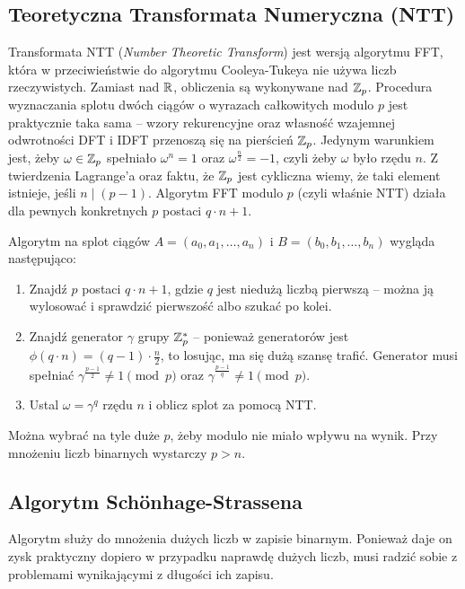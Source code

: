 \subsection{Teoretyczna Transformata Numeryczna (NTT)}
Transformata NTT (\textit{Number Theoretic Transform}) jest wersją algorytmu FFT, która w przeciwieństwie do algorytmu Cooleya-Tukeya nie używa liczb rzeczywistych. Zamiast nad \( \mathbb{R} \), obliczenia są wykonywane nad \( \mathbb{Z}_p \).
Procedura wyznaczania splotu dwóch ciągów o wyrazach całkowitych modulo \( p \) jest praktycznie taka sama -- wzory rekurencyjne oraz własność wzajemnej odwrotności DFT i IDFT przenoszą się na pierścień \( \mathbb{Z}_p \). Jedynym warunkiem jest, żeby \( \omega \in \mathbb{Z}_p \) spełniało \( \omega^n = 1 \) oraz  \( \omega^{\frac{n}{2}} = -1 \), czyli żeby \( \omega \) było rzędu \( n \).
Z twierdzenia Lagrange'a oraz faktu, że \( \mathbb{Z}_p \) jest cykliczna wiemy, że taki element istnieje, jeśli \( n \mid (p - 1) \). Algorytm FFT modulo \( p \) (czyli właśnie NTT) działa dla pewnych konkretnych \( p \) postaci \( q \cdot n + 1 \).

Algorytm na splot ciągów \( A = (a_0, a_1, \ldots, a_n) \) i \( B = (b_0, b_1, \ldots, b_n) \) wygląda następująco:
\begin{greyframe}
    \begin{enumerate}
        \item Znajdź \( p \) postaci \( q \cdot n + 1 \), gdzie \( q \) jest niedużą liczbą pierwszą -- można ją wylosować i sprawdzić pierwszość albo szukać po kolei.
        \item Znajdź generator \( \gamma \) grupy \( \mathbb{Z}^{*}_p \) -- ponieważ generatorów jest \( \phi(q \cdot n) = (q - 1) \cdot \frac{n}{2} \), to losując, ma się dużą szansę trafić.
        Generator musi spełniać \( \gamma^{\frac{p-1}{2}} \neq 1 \pmod{p} \) oraz \( \gamma^{\frac{p-1}{q}} \neq 1 \pmod{p} \).
        \item Ustal \( \omega = \gamma^q \) rzędu \( n \) i oblicz splot za pomocą NTT.
    \end{enumerate}
\end{greyframe}
Można wybrać na tyle duże \( p \), żeby modulo nie miało wpływu na wynik. Przy mnożeniu liczb binarnych wystarczy \( p > n \).

\subsection{Algorytm Sch{\"o}nhage-Strassena}
Algorytm służy do mnożenia dużych liczb w zapisie binarnym. Ponieważ daje on zysk praktyczny dopiero w przypadku naprawdę dużych liczb, musi radzić sobie z problemami wynikającymi z długości ich zapisu.

